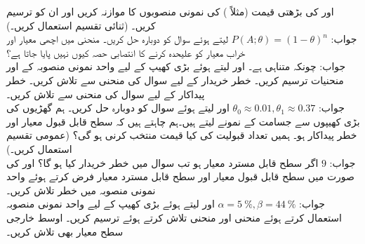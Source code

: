 \quad
{} اور  کی بڑھتی قیمت (مثلاً ) کی نمونی منصوبوں کا موازنہ کریں اور ان کو ترسیم کریں۔ (ثنائی تقسیم استعمال کریں۔)\\
جواب:\quad
$P(A;\theta)=(1-\theta)^n$
\quad
{} لیتے ہوئے  سوال  کو دوبارہ حل کریں۔
\quad
{} منحنی میں اچھی معیار اور خراب معیار کو علیحدہ کرنے کا انتصابی حصہ کیوں نہیں پایا جاتا ہے؟\\
جواب:\quad
چونکہ  متناہی ہے۔ 
\quad
{} اور  لیتے ہوئے بڑی کھیپ کے لیے واحد نمونی منصوبہ کے   اور  منحنیات ترسیم کریں۔
\quad
خطر خریدار  کے لیے سوال  کی منحنی سے  تلاش کریں۔ خطر پیداکار  کے لیے سوال  کی منحنی سے  تلاش کریں۔\\
جواب:\quad
$\theta_0\approx 0.01, \theta_1\approx 0.37$
\quad
{} اور  لیتے ہوئے سوال  کو دوبارہ حل کریں۔
\quad
ہم گھڑیوں کی بڑی کھیپوں سے  جسامت کے نمونے لیتے ہیں۔ہم چاہتے ہیں کہ  سطح قابل قبول معیار  اور خطر پیداکار  ہو۔ ہمیں تعداد قبولیت  کی کیا قیمت منتخب کرنی ہو گی؟ (عمومی تقسیم استعمال کریں۔)\\
جواب:\quad
$9$
\quad
اگر  سطح قابل مسترد معیار  ہو تب  سوال  میں خطر خریدار کیا ہو گا؟
\quad
{} اور  کی صورت میں سطح قابل قبول معیار  اور سطح قابل مسترد معیار  فرض کرتے ہوئے واحد نمونی منصوبہ میں خطر تلاش کریں۔\\
جواب:\quad
$\alpha=\SI{5}{\percent},\beta=\SI{44}{\percent}$
\quad
{} اور  لیتے ہوئے بڑی کھیپ کے لیے واحد نمونی منصوبہ استعمال کرتے ہوئے  منحنی اور  منحنی تلاش کرتے ہوئے ترسیم کریں۔ اوسط خارجی سطح معیار بھی تلاش کریں۔

